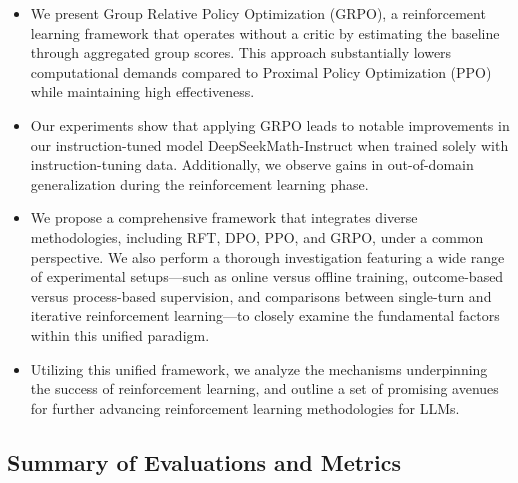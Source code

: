 \begin{itemize}[topsep=0pt]
    \item We present Group Relative Policy Optimization (GRPO), a reinforcement learning framework that operates without a critic by estimating the baseline through aggregated group scores. This approach substantially lowers computational demands compared to Proximal Policy Optimization (PPO) while maintaining high effectiveness.
    \item Our experiments show that applying GRPO leads to notable improvements in our instruction-tuned model DeepSeekMath-Instruct when trained solely with instruction-tuning data. Additionally, we observe gains in out-of-domain generalization during the reinforcement learning phase.
    \item We propose a comprehensive framework that integrates diverse methodologies, including RFT, DPO, PPO, and GRPO, under a common perspective. We also perform a thorough investigation featuring a wide range of experimental setups—such as online versus offline training, outcome-based versus process-based supervision, and comparisons between single-turn and iterative reinforcement learning—to closely examine the fundamental factors within this unified paradigm.
    \item Utilizing this unified framework, we analyze the mechanisms underpinning the success of reinforcement learning, and outline a set of promising avenues for further advancing reinforcement learning methodologies for LLMs.
\end{itemize}

\subsection{Summary of Evaluations and Metrics}

